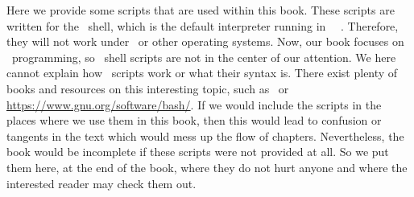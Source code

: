 %
%
Here we provide some scripts that are used within this book.
These scripts are written for the \bash\ shell, which is the default interpreter running in \ubuntu\ \linux\ .
Therefore, they will not work under \windows\ or other operating systems.
Now, our book focuses on \python\ programming, so \bash\ shell scripts are not in the center of our attention.
We here cannot explain how \bash\ scripts work or what their syntax is.
There exist plenty of books and resources on this interesting topic, such as~\cite{NR2005LTBSUSPCB3,Z2017MB,BN2018BC} or \url{https://www.gnu.org/software/bash/}.
If we would include the scripts in the places where we use them in this book, then this would lead to confusion or tangents in the text which would mess up the flow of chapters.
Nevertheless, the book would be incomplete if these scripts were not provided at all.
So we put them here, at the end of the book, where they do not hurt anyone and where the interested reader may check them out.%
%
%
%
\FloatBarrier%
\endhsection%
%
